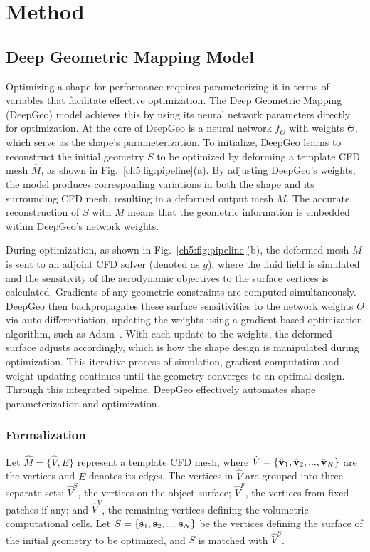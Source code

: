 \section{Method}
\subsection{Deep Geometric Mapping Model}
\label{ch5:sec:dmm}

Optimizing a shape for performance requires parameterizing it in terms of variables that facilitate effective optimization. The Deep Geometric Mapping (DeepGeo) model achieves this by using its neural network parameters directly for optimization. At the core of DeepGeo is a neural network $f_{\Theta}$ with weights $\Theta$, which serve as the shape’s parameterization. To initialize, DeepGeo learns to reconstruct the initial geometry $S$ to be optimized by deforming a template CFD mesh $\hat{M}$, as shown in Fig.~\ref{ch5:fig:pipeline}(a). By adjusting DeepGeo’s weights, the model produces corresponding variations in both the shape and its surrounding CFD mesh, resulting in a deformed output mesh $M$. The accurate reconstruction of $S$ with $M$ means that the geometric information is embedded within DeepGeo's network weights. 

During optimization, as shown in Fig.~\ref{ch5:fig:pipeline}(b), the deformed mesh $M$ is sent to an adjoint CFD solver (denoted as $g$), where the fluid field is simulated and the sensitivity of the aerodynamic objectives to the surface vertices is calculated.  Gradients of any geometric constraints are computed simultaneously. DeepGeo then backpropagates these surface sensitivities to the network weights $\Theta$ via auto-differentiation, updating the weights using a gradient-based optimization algorithm, such as Adam~\cite{ai.Kingma2015b}. With each update to the weights, the deformed surface adjusts accordingly, which is how the shape design is manipulated during optimization. This iterative process of simulation, gradient computation and weight updating continues until the geometry converges to an optimal design. Through this integrated pipeline, DeepGeo effectively automates shape parameterization and optimization.

\subsubsection{Formalization} 
\label{ch5:sec:formalization}

Let $\hat{M}=\{\hat{V}, E\}$ represent a template CFD mesh, where $\hat{V}=\{\hat{\mathbf{v}}_1, \hat{\mathbf{v}}_2, ..., \hat{\mathbf{v}}_N\}$ are the vertices and $E$ denotes its edges. 
The vertices in $\hat{V}$ are grouped into three separate sets: $\hat{V}^S$, the vertices on the object surface; $\hat{V}^F$, the vertices from fixed patches if any; and $\hat{V}^V$, the remaining vertices defining the volumetric computational cells. 
Let $S=\{\mathbf{s}_1, \mathbf{s}_2,...,\mathbf{s}_N\}$ be the vertices defining the surface of the initial geometry to be optimized, and $S$ is matched with $\hat{V}^S$. 

